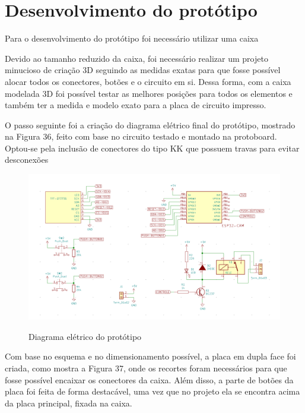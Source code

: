 \section{Desenvolvimento do protótipo}\label{sec:prototipo}

Para o desenvolvimento do protótipo foi necessário utilizar uma caixa

Devido ao tamanho reduzido da caixa, foi necessário realizar um projeto minucioso de
criação 3D seguindo as medidas exatas para que fosse possível alocar todos os conectores, botões
e o circuito em si. Dessa forma, com a caixa modelada 3D foi possível testar as melhores posições
para todos os elementos e também ter a medida e modelo exato para a placa de circuito impresso.

O passo seguinte foi a criação do diagrama elétrico final do protótipo, mostrado na Figura
36, feito com base no circuito testado e montado na protoboard. Optou-se pela inclusão de
conectores do tipo KK que possuem travas para evitar desconexões


\begin{figure}[h!]
    \centering
    \caption{Diagrama elétrico do protótipo}
    \includegraphics[scale=0.3]{figuras/circuito_completo.png}
    \fonte{}%
    \label{fig:circuito}
    \centering
\end{figure}

Com base no esquema e no dimensionamento possível, a placa em dupla face foi criada,
como mostra a Figura 37, onde os recortes foram necessários para que fosse possível encaixar os
conectores da caixa. Além disso, a parte de botões da placa foi feita de forma destacável, uma
vez que no projeto ela se encontra acima da placa principal, fixada na caixa.

